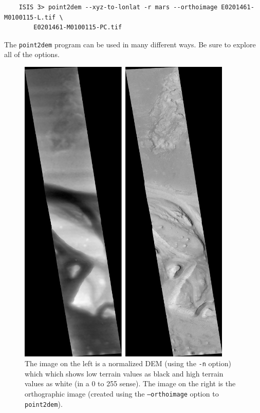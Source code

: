 \begin{verbatim}
    ISIS 3> point2dem --xyz-to-lonlat -r mars --orthoimage E0201461-M0100115-L.tif \
        E0201461-M0100115-PC.tif
\end{verbatim}

\noindent
The \texttt{point2dem} program can be used in many different ways.
Be sure to explore all of the options.

\begin{figure}
\begin{minipage}{4in}
\includegraphics[width=4in]{images/p19-norm_ortho.png}
\end{minipage}
\hfill
\begin{minipage}{2.7in}
\caption[P19 Normalized DEM and Orthophoto]{
    \label{p19-norm_ortho}
	The image on the left is a normalized DEM (using the
	\texttt{-n} option) which which shows low terrain values
	as black and high terrain values as white (in a 0 to 255
	sense).  The image on the right is the orthographic image
	(created using the \texttt{--orthoimage} option to
	\texttt{point2dem}).
    }
\end{minipage} \end{figure}

